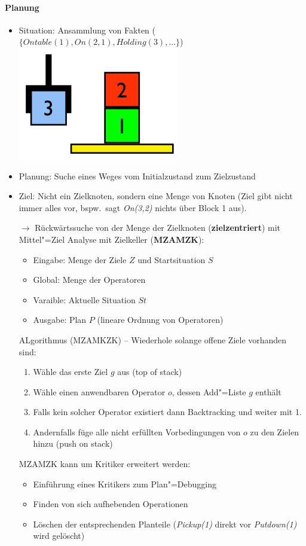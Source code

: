 \paragraph{Planung}
\begin{itemize}
	\item Situation: Ansammlung von Fakten ($\{ Ontable(1), On(2, 1), Holding(3), ... \}$)\\
	\includegraphics[width=.2\textwidth]{figures/ch06_strips-bsp.png}
	\item Planung: Suche eines Weges vom Initialzustand zum Zielzustand
	\item Ziel: Nicht ein Zielknoten, sondern eine Menge von Knoten (Ziel gibt nicht immer alles vor, bspw.\ sagt \emph{On(3,2)} nichts über Block 1 aus).
	\item [$\rightarrow$] Rückwärtssuche von der Menge der Zielknoten (\textbf{zielzentriert}) mit Mittel"=Ziel Analyse mit Zielkeller (\textbf{MZAMZK}):
	\begin{itemize}
		\item Eingabe: Menge der Ziele $Z$ und Startsituation $S$
		\item Global: Menge der Operatoren
		\item Varaible: Aktuelle Situation $St$
		\item Ausgabe: Plan $P$ (lineare Ordnung von Operatoren)
	\end{itemize}
	ALgorithmus (MZAMKZK) -- Wiederhole solange offene Ziele vorhanden sind:
	\begin{enumerate}
		 \item Wähle das erste Ziel $g$ aus (top of stack)
		 \item Wähle einen anwendbaren Operator $o$, dessen Add"=Liste $g$ enthält
		 \item Falls kein solcher Operator existiert dann Backtracking und weiter mit 1.
		 \item Andernfalls füge alle nicht erfüllten Vorbedingungen von $o$ zu den Zielen hinzu (push on stack)
	\end{enumerate}
	MZAMZK kann um Kritiker erweitert werden:
	\begin{itemize}
		\item Einführung eines Kritikers zum Plan"=Debugging
		\item Finden von sich aufhebenden Operationen
		\item Löschen der entsprechenden Planteile (\emph{Pickup(1)} direkt vor \emph{Putdown(1)} wird gelöscht)
	\end{itemize}
\end{itemize}

